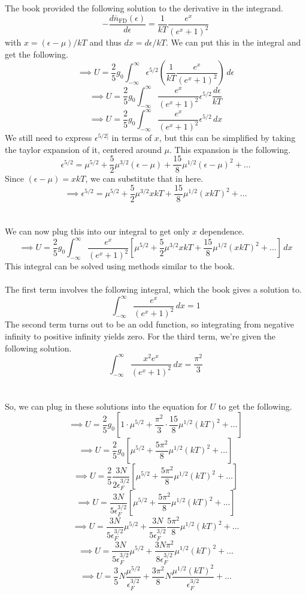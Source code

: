 \documentclass[12pt]{article}
\begin{document}
\begin{flushleft}
The book provided the following solution to the derivative in the integrand.
$$-\frac{d\overline{n}_\text{FD}(\epsilon)}{d\epsilon}=\frac{1}{kT}\frac{e^x}{(e^x+1)^2}$$
with $x=(\epsilon-\mu)/kT$ and thus $dx=d\epsilon/kT$.
We can put this in the integral and get the following.
$$\implies U=\frac{2}{5}g_0\int_{-\infty}^\infty\epsilon^{5/2}\left(\frac{1}{kT}\frac{e^x}{(e^x+1)^2}\right)\,d\epsilon$$
$$\implies U=\frac{2}{5}g_0\int_{-\infty}^\infty\frac{e^x}{(e^x+1)^2}\epsilon^{5/2}\frac{d\epsilon}{kT}$$
$$\implies U=\frac{2}{5}g_0\int_{-\infty}^\infty\frac{e^x}{(e^x+1)^2}\epsilon^{5/2}\,dx$$
We still need to express $\epsilon^{5/2]}$ in terms of $x$, but this can be simplified by taking the taylor expansion of it, centered around $\mu$.
This expansion is the following.
$$\epsilon^{5/2}=\mu^{5/2}+\frac{5}{2}\mu^{3/2}(\epsilon-\mu)+\frac{15}{8}\mu^{1/2}(\epsilon-\mu)^2+\dots$$
Since $(\epsilon-\mu)=xkT$, we can substitute that in here.
$$\implies\epsilon^{5/2}=\mu^{5/2}+\frac{5}{2}\mu^{3/2}xkT+\frac{15}{8}\mu^{1/2}(xkT)^2+\dots$$\\~\\

We can now plug this into our integral to get only $x$ dependence.
$$\implies U=\frac{2}{5}g_0\int_{-\infty}^\infty\frac{e^x}{(e^x+1)^2}\left[\mu^{5/2}+\frac{5}{2}\mu^{3/2}xkT+\frac{15}{8}\mu^{1/2}(xkT)^2+\dots\right]\,dx$$
This integral can be solved using methods similar to the book.\\~\\

The first term involves the following integral, which the book gives a solution to.
$$\int_{-\infty}^\infty\frac{e^x}{(e^x+1)^2}\,dx=1$$
The second term turns out to be an odd function, so integrating from negative infinity to positive infinity yields zero.
For the third term, we're given the following solution.
$$\int_{-\infty}^\infty\frac{x^2e^x}{(e^x+1)^2}\,dx=\frac{\pi^2}{3}$$\\~\\

So, we can plug in these solutions into the equation for $U$ to get the following.
$$\implies U=\frac{2}{5}g_0\left[1\cdot\mu^{5/2}+\frac{\pi^2}{3}\cdot\frac{15}{8}\mu^{1/2}(kT)^2+\dots\right]$$
$$\implies U=\frac{2}{5}g_0\left[\mu^{5/2}+\frac{5\pi^2}{8}\mu^{1/2}(kT)^2+\dots\right]$$
$$\implies U=\frac{2}{5}\frac{3N}{2\epsilon_F^{3/2}}\left[\mu^{5/2}+\frac{5\pi^2}{8}\mu^{1/2}(kT)^2+\dots\right]$$
$$\implies U=\frac{3N}{5\epsilon_F^{3/2}}\left[\mu^{5/2}+\frac{5\pi^2}{8}\mu^{1/2}(kT)^2+\dots\right]$$
$$\implies U=\frac{3N}{5\epsilon_F^{3/2}}\mu^{5/2}+\frac{3N}{5\epsilon_F^{3/2}}\frac{5\pi^2}{8}\mu^{1/2}(kT)^2+\dots$$
$$\implies U=\frac{3N}{5\epsilon_F^{3/2}}\mu^{5/2}+\frac{3N\pi^2}{8\epsilon_F^{3/2}}\mu^{1/2}(kT)^2+\dots$$
$$\implies U=\frac{3}{5}N\frac{\mu^{5/2}}{\epsilon_F^{3/2}}+\frac{3\pi^2}{8}N\frac{\mu^{1/2}(kT)^2}{\epsilon_F^{3/2}}+\dots$$\\~\\


\end{flushleft}
\end{document}
